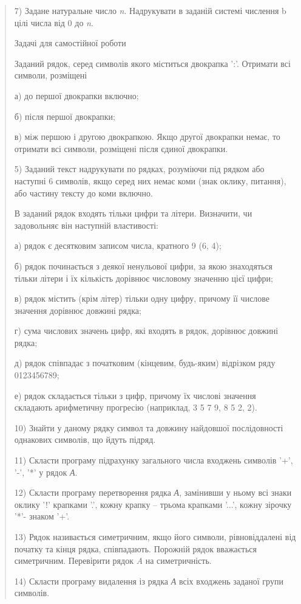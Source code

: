\documentclass[]{article}
\begin{document}
\begin{quote}
7) Задане натуральне число \emph{n}. Надрукувати в заданій системі
числення b цілі числа від 0 до \emph{n}.

Задачі для самостійної роботи

Заданий рядок, серед символів якого міститься двокрапка ':'. Отримати
всі символи, розміщені

а) до першої двокрапки включно;

б) після першої двокрапки;

в) між першою і другою двокрапкою. Якщо другої двокрапки немає, то
отримати всі символи, розміщені після єдиної двокрапки.

5) Заданий текст надрукувати по рядках, розуміючи під рядком або
наступні 6 символів, якщо серед них немає коми (знак оклику, питання),
або частину тексту до коми включно.

В заданий рядок входять тільки цифри та літери. Визначити, чи
задовольняє він наступній властивості:

а) рядок є десятковим записом числа, кратного 9 (6, 4);

б) рядок починається з деякої ненульової цифри, за якою знаходяться
тільки літери і їх кількість дорівнює числовому значенню цієї цифри;

в) рядок містить (крім літер) тільки одну цифру, причому її числове
значення дорівнює довжині рядка;

г) сума числових значень цифр, які входять в рядок, дорівнює довжині
рядка;

д) рядок співпадає з початковим (кінцевим, будь-яким) відрізком ряду
0123456789;

е) рядок складається тільки з цифр, причому їх числові значення
складають арифметичну прогресію (наприклад, 3 5 7 9, 8 5 2, 2).

10) Знайти у даному рядку символ та довжину найдовшої послідовності
однакових символів, що йдуть підряд.

11) Скласти програму підрахунку загального числа входжень символів '+',
'-', '*' у рядок \emph{А}.

12) Скласти програму перетворення рядка \emph{А}, замінивши у ньому всі
знаки оклику '!' крапками '.', кожну крапку -- трьома крапками '...',
кожну зірочку '*'- знаком '+'.

13) Рядок називається симетричним, якщо його символи, рівновіддалені від
початку та кінця рядка, співпадають. Порожній рядок вважається
симетричним. Перевірити рядок \emph{A} на симетричність.

14) Скласти програму видалення із рядка \emph{А} всіх входжень заданої
групи символів.


\end{quote}
\end{document}

